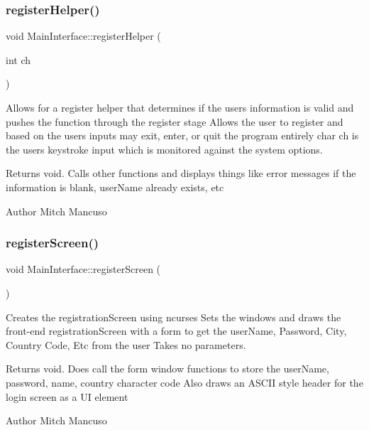 \subsubsection{\texorpdfstring{register\+Helper()}{registerHelper()}}
{\footnotesize\ttfamily void Main\+Interface\+::register\+Helper (\begin{DoxyParamCaption}\item[{int}]{ch }\end{DoxyParamCaption})}



Allows for a register helper that determines if the user\textquotesingle{}s information is valid and pushes the function through the register stage  Allows the user to register and based on the user\textquotesingle{}s inputs may exit, enter, or quit the program entirely  char ch is the user\textquotesingle{}s keystroke input which is monitored against the system options. 

\begin{DoxyReturn}{Returns}
void. Calls other functions and displays things like error messages if the information is blank, user\+Name already exists, etc 
\end{DoxyReturn}
\begin{DoxyAuthor}{Author}
Mitch Mancuso 
\end{DoxyAuthor}
\mbox{\label{class_main_interface_a2453e08da319d026a2ef0b724b445928}} 
\subsubsection{\texorpdfstring{register\+Screen()}{registerScreen()}}
{\footnotesize\ttfamily void Main\+Interface\+::register\+Screen (\begin{DoxyParamCaption}{ }\end{DoxyParamCaption})}



Creates the registration\+Screen using ncurses  Sets the windows and draws the front-\/end registration\+Screen with a form to get the user\+Name, Password, City, Country Code, Etc from the user  Takes no parameters. 

\begin{DoxyReturn}{Returns}
void. Does call the form window functions to store the user\+Name, password, name, country character code Also draws an A\+S\+C\+II style header for the login screen as a UI element 
\end{DoxyReturn}
\begin{DoxyAuthor}{Author}
Mitch Mancuso 
\end{DoxyAuthor}
\mbox{\label{class_main_interface_a34de3c148d9a99f336111ee9c4ba87e0}} 
